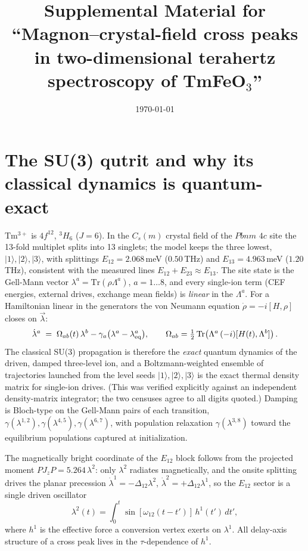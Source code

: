 \documentclass[11pt]{article}
\title{Supplemental Material for\\
``Magnon--crystal-field cross peaks in two-dimensional terahertz
spectroscopy of TmFeO$_3$''}
\author{}
\date{\today}
\newcommand{\ket}[1]{|#1\rangle}
\begin{document}
\maketitle
\tableofcontents

\section{The SU(3) qutrit and why its classical dynamics is quantum-exact}
\label{si:qutrit}

Tm$^{3+}$ is $4f^{12}$, $^3H_6$ ($J=6$).  In the $C_s(m)$ crystal field of
the $Pbnm$ $4c$ site the 13-fold multiplet splits into 13 singlets; the
model keeps the three lowest, $\ket{1},\ket{2},\ket{3}$, with splittings
$E_{12}=2.068$\,meV ($0.50$\,THz) and $E_{13}=4.963$\,meV ($1.20$\,THz),
consistent with the measured lines $E_{12}+E_{23}\approx E_{13}$.  The
site state is the Gell-Mann vector $\lambda^a=\mathrm{Tr}(\rho\Lambda^a)$,
$a=1\dots8$, and every single-ion term (CEF energies, external drives,
exchange mean fields) is \emph{linear} in the $\Lambda^a$.  For a
Hamiltonian linear in the generators the von Neumann equation
$\dot\rho=-i[H,\rho]$ closes on $\vec\lambda$:
\begin{equation}
  \dot\lambda^a \;=\; \Omega_{ab}(t)\,\lambda^b
  -\gamma_a\big(\lambda^a-\lambda^a_{\rm eq}\big),\qquad
  \Omega_{ab}=\tfrac12\,\mathrm{Tr}\!\left(\Lambda^a\,
  (-i)[H(t),\Lambda^b]\right).
\end{equation}
The classical SU(3) propagation is therefore the \emph{exact} quantum
dynamics of the driven, damped three-level ion, and a Boltzmann-weighted
ensemble of trajectories launched from the level seeds
$\ket1,\ket2,\ket3$ is the exact thermal density matrix for single-ion
drives.  (This was verified explicitly against an independent
density-matrix integrator; the two censuses agree to all digits quoted.)
Damping is Bloch-type on the Gell-Mann pairs of each transition,
$\gamma(\lambda^{1,2}),\gamma(\lambda^{4,5}),\gamma(\lambda^{6,7})$, with
population relaxation $\gamma(\lambda^{3,8})$ toward the equilibrium
populations captured at initialization.

The magnetically bright coordinate of the $E_{12}$ block follows from the
projected moment $P J_z P=5.264\,\lambda^2$: only $\lambda^2$ radiates
magnetically, and the onsite splitting drives the planar precession
$\dot\lambda^1=-\Delta_{12}\lambda^2$,
$\dot\lambda^2=+\Delta_{12}\lambda^1$, so the $E_{12}$ sector is a single
driven oscillator
\begin{equation}
  \lambda^2(t)=\int_0^t \sin[\omega_{12}(t-t')]\,h^1(t')\,dt',
  \label{eq:si-osc}
\end{equation}
where $h^1$ is the effective force a conversion vertex exerts on
$\lambda^1$.  All delay-axis structure of a cross peak lives in the
$\tau$-dependence of $h^1$.
\end{document}
